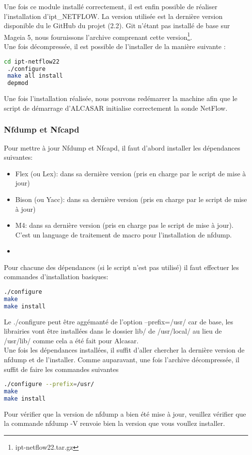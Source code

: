 Une fois ce module installé correctement, il est enfin possible de réaliser l'installation d'ipt\_NETFLOW. La version utilisée est la dernière version disponible du le GitHub du projet (2.2). Git n'étant pas installé de base sur Mageia 5, nous fournissons l'archive comprenant cette version\footnote{ipt-netflow22.tar.gz}.\\
Une fois décompressée, il est possible de l'installer de la manière suivante :
\begin{lstlisting}[language=bash,style=custombash]
 cd ipt-netflow22
 ./configure
 make all install
 depmod
\end{lstlisting}
Une fois l'installation réalisée, nous pouvons redémarrer la machine afin que le script de démarrage d'ALCASAR initialise correctement la sonde NetFlow.

\subsubsection{Nfdump et Nfcapd}
Pour mettre à jour Nfdump et Nfcapd, il faut d'abord installer les dépendances suivantes:
\begin{itemize}
\item Flex (ou Lex): dans sa dernière version (pris en charge par le script de mise à jour)
\item Bison (ou Yacc): dans sa dernière version (pris en charge par le script de mise à jour)
\item M4: dans sa dernière version (pris en charge pas le script de mise à jour). C'est un language de traitement de macro pour l'installation de nfdump.
\item 
\end{itemize}
Pour chacune des dépendances (si le script n'est pas utilisé) il faut effectuer les commandes d'installation basiques:
\begin{lstlisting}[language=bash,style=custombash]
./configure 
make
make install
\end{lstlisting}
Le ./configure peut être aggémanté de l'option --prefix=/usr/ car de base, les librairies vont être installées dans le dossier lib/ de /usr/local/ au lieu de /usr/lib/ comme cela a été fait pour Alcasar.\\
Une fois les dépendances installées, il suffit d'aller chercher la dernière version de nfdump et de l'installer. Comme auparavant, une fois l'archive décompressée, il suffit de faire les commandes suivantes
\begin{lstlisting}[language=bash,style=custombash]
./configure --prefix=/usr/
make
make install
\end{lstlisting}
Pour vérifier que la version de nfdump a bien été mise à jour, veuillez vérifier que la commande nfdump -V renvoie bien la version que vous voullez installer.


